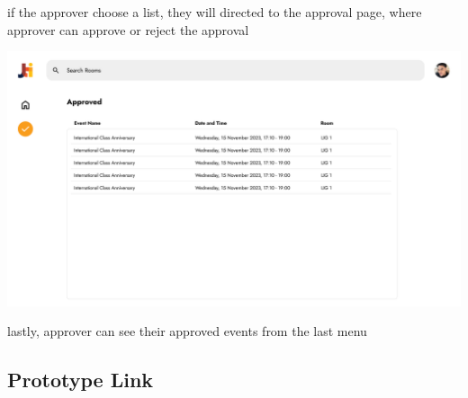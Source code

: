 \documentclass[12pt,titlepage,a4paper]{report}
\begin{document}
    if the approver choose a list, they will directed to the approval page, where approver can approve or reject the approval
    \begin{center}
        \includegraphics[width=\textwidth]{images/figures/UIUX/approved.png}\\
    \end{center}
    lastly, approver can see their approved events from the last menu
    \subsection{Prototype Link}
    \noindent
\end{document}
